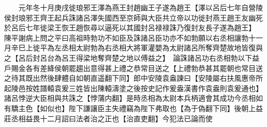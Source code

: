 　　元年冬十月庚戌徙琅邪王澤為燕王封趙幽王子遂為趙王【澤以呂后七年自營陵侯封琅邪王齊王起兵誅諸呂澤失國西至京師與大臣共立帝以功徙封燕王趙王友幽死於呂后七年徙梁王恢王趙恢尋以逼死以其國封呂禄禄誅乃復封友長子遂為趙王】　陳平謝病上問之平曰高祖時勃功不如臣及誅諸呂臣功亦不如勃願以右丞相讓勃十一月辛巳上徙平為左丞相太尉勃為右丞相大將軍灌嬰為太尉諸呂所奪齊楚故地皆復與之【呂后封呂台為呂王得梁地奪齊楚之地以傅益之】　論誅諸呂功右丞相勃以下益戶賜金各有差絳侯朝罷趨出意得甚上禮之恭常目送之【上禮勃恭甚其罷朝也常目送之待其既出然後肆體自如朝直遥翻下同】郎中安陵袁盎諫曰【安陵屬右扶風惠帝所起陵邑按姓譜轅袁爰三姓皆出陳轅濤塗之後按史記作爰盎漢書作袁盎則袁爰通也】諸呂悖逆大臣相與共誅之【悖蒲内翻】是時丞相為太尉本兵柄適會其成功今丞相如有驕主色【如似也】陛下謙讓臣主失禮竊為陛下弗取也【為于偽翻下同】後朝上益莊丞相益畏十二月詔曰法者治之正也【治直吏翻】今犯法已論而使

